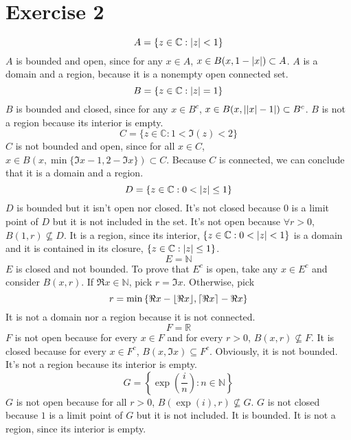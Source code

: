\documentclass{report}
\def\C{\mathbb{C}}
\def\R{\mathbb{R}}
\def\N{\mathbb{N}}
\DeclarePairedDelimiter\abs{\lvert}{\rvert}%
\DeclarePairedDelimiter\ceil{\lceil}{\rceil}
\DeclarePairedDelimiter\floor{\lfloor}{\rfloor}
\renewcommand{\exp}[1]{\operatorname{exp}\left(#1\right)}
\begin{document}
    \section*{Exercise 2}
    \begin{equation*}
        A = \{z \in \C : \abs{z} < 1\}
    \end{equation*}
    $A$ is bounded and open, since for any $x \in A$, $x \in B(x, 1 - \abs{x}) \subset A$. $A$ is a domain and a region, because it is a nonempty open connected set.
    \begin{equation*}
        B = \{z \in \C : \abs{z} = 1\}
    \end{equation*}
    $B$ is bounded and closed, since for any $x \in B^c$, $x \in B(x, \abs{\abs{x} - 1}) \subset B^c$. $B$ is not a region because its interior is empty.
    \begin{equation*}
        C = \{z \in \C : 1 < \Im(z) < 2\}
    \end{equation*}
    $C$ is not bounded and open, since for all $x \in C$, $x \in B(x, \min{\{\Im{x} - 1, 2 - \Im{x}}\}) \subset C$. Because $C$ is connected, we can conclude that it is a domain and a region.
    \begin{equation*}
        D = \{z \in \C : 0 < \abs{z} \leq 1\}
    \end{equation*}
    $D$ is bounded but it isn't open nor closed. It's not closed because $0$ is a limit point of $D$ but it is not included in the set. It's not open because $\forall r > 0$, $B(1, r) \nsubseteq D$. It is a region, since its interior, $\{z \in \C : 0 < \abs{z} < 1\}$ is a domain and it is contained in its closure, $\{z \in \C : \abs{z} \leq 1\}$.
    \begin{equation*}
        E = \N
    \end{equation*}
    $E$ is closed and not bounded. To prove that $E^c$ is open, take any $x \in E^c$ and consider $B(x, r)$. If $\Re{x} \in \N$, pick $r = \Im{x}$. Otherwise, pick 
    \begin{equation*}
        r = \min{\{\Re{x} - \floor{\Re{x}}, \ceil{\Re{x}} - \Re{x}\}}
    \end{equation*}
    It is not a domain nor a region because it is not connected.
    \begin{equation*}
        F = \R
    \end{equation*}
    $F$ is not open because for every $x \in F$ and for every $r > 0$, $B(x, r) \nsubseteq F$. It is closed because for every $x \in F^c$, $B(x, \Im{x}) \subseteq F^c$. Obviously, it is not bounded. It's not a region because its interior is empty.
    \begin{equation*}
        G = \left\{\exp{\frac{i}{n}} : n \in \N\right\}
    \end{equation*}
    $G$ is not open because for all $r > 0$, $B(\exp{i}, r) \nsubseteq G$. $G$ is not closed because $1$ is a limit point of $G$ but it is not included. It is bounded. It is not a region, since its interior is empty.
\end{document}
